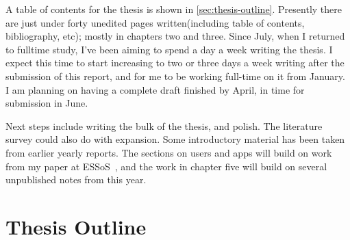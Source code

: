 \documentclass[a4paper]{scrartcl}
\begin{document}
A table of contents for the thesis is shown in \autoref{sec:thesis-outline}.
Presently there are just under forty unedited pages written(including table of
contents, bibliography, etc); mostly in chapters two and three. Since July, when
I returned to fulltime study, I've been aiming to spend a day a week writing the
thesis. I expect this time to start increasing to two or three days a week
writing after the submission of this report, and for me to be working full-time
on it from January. I am planning on having a complete draft finished by April,
in time for submission in June.


Next steps include writing the bulk of the thesis, and polish.  The literature
survey could also do with expansion.  Some introductory material has been
taken from earlier yearly reports.  The sections on users and apps will build on
work from my paper at ESSoS~\cite{hallett_apppal_2016}, and the work in chapter
five will build on several unpublished notes from this year.




\pagebreak
\appendix
\section{Thesis Outline}
\label{sec:thesis-outline}
\end{document}
